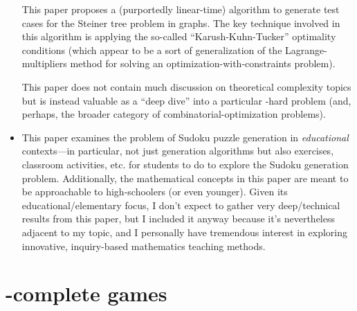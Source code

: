 \begin{itemize}
\begin{annotation}
      This paper proposes a (purportedly linear-time) algorithm to generate
      test cases for the Steiner tree problem in graphs.  The key technique
      involved in this algorithm is applying the so-called
      ``Karush-Kuhn-Tucker'' optimality conditions (which appear to be a sort
      of generalization of the Lagrange-multipliers method for solving an
      optimization-with-constraints problem).

      This paper does not contain much discussion on theoretical complexity
      topics but is instead valuable as a ``deep dive'' into a particular
      \NP-hard problem (and, perhaps, the broader category of
      combinatorial-optimization problems).
    \end{annotation}

  \item {}

    \begin{annotation}
      This paper examines the problem of Sudoku puzzle generation in
      \emph{educational} contexts---in particular, not just generation
      algorithms but also exercises, classroom activities, etc. for students to
      do to explore the Sudoku generation problem.  Additionally, the
      mathematical concepts in this paper are meant to be approachable to
      high-schoolers (or even younger).  Given its educational/elementary
      focus, I don't expect to gather very deep/technical results from this
      paper, but I included it anyway because it's nevertheless adjacent to my
      topic, and I personally have tremendous interest in exploring innovative,
      inquiry-based mathematics teaching methods.
    \end{annotation}

\end{itemize}

\section{\PSPACE-complete games}



